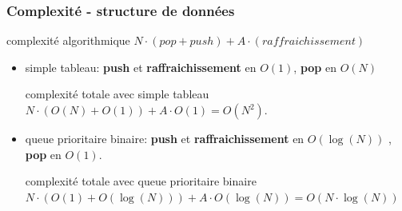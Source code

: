 \documentclass[]{beamer}
\begin{document}
\begin{frame}
  \frametitle{Complexité - structure de données}
  \begin{block}{complexité algorithmique}
  $N \cdot (pop + push) + A \cdot (raffraichissement)$
  \end{block}
  \begin{itemize}
  \item simple tableau:
  \textbf {push} et \textbf {raffraichissement} en $O(1)$, \textbf {pop} en $O(N)$
  \begin{block}{complexité totale avec simple tableau}
  $N \cdot (O(N) + O(1)) + A \cdot O(1) = O(N^2)$. 
  \end{block}
  \item queue prioritaire binaire:
  \textbf {push} et \textbf {raffraichissement} en $O(\log(N))$ ,  \textbf {pop} en $O(1)$.
  \begin{block}{complexité totale avec queue prioritaire binaire}
  $N \cdot (O(1) + O(\log(N))) + A \cdot O(\log(N)) = O(N \cdot \log(N))$
  \end{block}
  \end{itemize}
\end{frame}
\end{document}
